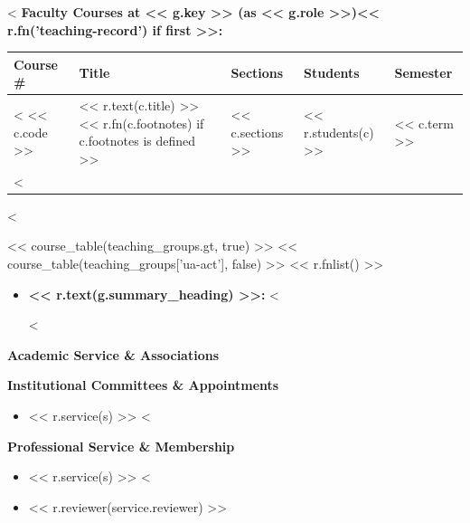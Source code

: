 \documentclass[11pt]{article}
\begin{document}
<%
\textbf{Faculty Courses at << g.key >> (as << g.role >>)<< r.fn('teaching-record') if first >>:}\\
{\normalsize
\begin{tabular}{@{}p{2.5cm} p{6.0cm} p{2.0cm} p{2.0cm} p{3.0cm}@{}}
    \toprule
    \textbf{Course \#} & \textbf{Title} & \textbf{Sections} & \textbf{Students} & \textbf{Semester} \\
    \midrule
<%
    << c.code >> & << r.text(c.title) >><< r.fn(c.footnotes) if c.footnotes is defined >> & << c.sections >> & << r.students(c) >> & << c.term >> \\
<%
    \bottomrule
\end{tabular}
}
<%

<< course_table(teaching_groups.gt, true) >>
<< course_table(teaching_groups['ua-act'], false) >>
<< r.fnlist() >>

\begin{itemize}[leftmargin=*,nosep]
<%
<%
    \item \textbf{<< r.text(g.summary_heading) >>:} <%

<%
\end{itemize}

\medskip

{\Large\textbf{Academic Service \& Associations}}

{\large\textbf{Institutional Committees \& Appointments}}

\begin{itemize}[leftmargin=*,nosep]
<%
    \item << r.service(s) >>
<%
\end{itemize}

{\large\textbf{Professional Service \& Membership}}

\begin{itemize}[leftmargin=*,nosep]
<%
    \item << r.service(s) >>
<%
    \item << r.reviewer(service.reviewer) >>
\end{itemize}
\end{document}
